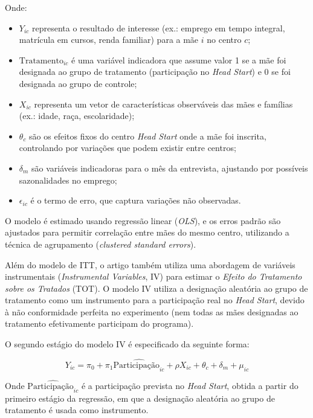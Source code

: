 \documentclass[a4paper,12pt]{article}[abntex2]
\begin{document}
Onde:
\begin{itemize}
    \item \( Y_{ic} \) representa o resultado de interesse (ex.: emprego em tempo integral, matrícula em cursos, renda familiar) para a mãe \( i \) no centro \( c \);
    \item \( \text{Tratamento}_{ic} \) é uma variável indicadora que assume valor 1 se a mãe foi designada ao grupo de tratamento (participação no \textit{Head Start}) e 0 se foi designada ao grupo de controle;
    \item \( X_{ic} \) representa um vetor de características observáveis das mães e famílias (ex.: idade, raça, escolaridade);
    \item \( \theta_c \) são os efeitos fixos do centro \textit{Head Start} onde a mãe foi inscrita, controlando por variações que podem existir entre centros;
    \item \( \delta_m \) são variáveis indicadoras para o mês da entrevista, ajustando por possíveis sazonalidades no emprego;
    \item \( \epsilon_{ic} \) é o termo de erro, que captura variações não observadas.
\end{itemize}

O modelo é estimado usando regressão linear (\textit{OLS}), e os erros padrão são ajustados para permitir correlação entre mães do mesmo centro, utilizando a técnica de agrupamento (\textit{clustered standard errors}).

Além do modelo de ITT, o artigo também utiliza uma abordagem de variáveis instrumentais (\textit{Instrumental Variables}, IV) para estimar o \textit{Efeito do Tratamento sobre os Tratados} (TOT). O modelo IV utiliza a designação aleatória ao grupo de tratamento como um instrumento para a participação real no \textit{Head Start}, devido à não conformidade perfeita no experimento (nem todas as mães designadas ao tratamento efetivamente participam do programa).

O segundo estágio do modelo IV é especificado da seguinte forma:

\begin{equation}
Y_{ic} = \pi_0 + \pi_1 \hat{\text{Participação}_{ic}} + \rho X_{ic} + \theta_c + \delta_m + \mu_{ic}
\end{equation}

Onde \( \hat{\text{Participação}_{ic}} \) é a participação prevista no \textit{Head Start}, obtida a partir do primeiro estágio da regressão, em que a designação aleatória ao grupo de tratamento é usada como instrumento.
\end{document}
